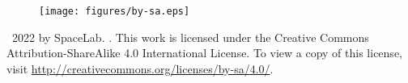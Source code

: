 \vfill

\begin{figure}[!h]
	\begin{center}
		\texttt{[image: figures/by-sa.eps]}
	\end{center}
\end{figure}

\textcopyright\  2022 by SpaceLab. \thetitle. This work is licensed under the Creative Commons Attribution-ShareAlike 4.0 International License. To view a copy of this license, visit \href{http://creativecommons.org/licenses/by-sa/4.0/}{http://creativecommons.org/licenses/by-sa/4.0/}.
